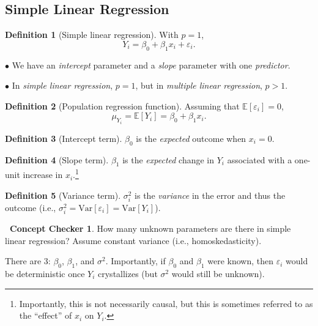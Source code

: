 \documentclass[12pt,oneside]{article}
\newcommand{\E}{\mathbb{E}}
\newcommand{\Var}{\text{Var}}
\theoremstyle{definition}
\newtheorem{definition}{Definition}
\newtheorem{concept}{\faPen \ Concept Checker}
\theoremstyle{remark}
\begin{document}
\subsection{Simple Linear Regression}

\begin{definition}[Simple linear regression]
With $p = 1$, \[Y_i = \beta_0 + \beta_1 x_i + \varepsilon_i.\]

$\bullet$ We have an \textit{intercept} parameter and a \textit{slope} parameter with one \textit{predictor}.

$\bullet$ In \textit{simple linear regression}, $p = 1$, but in \textit{multiple linear regression}, $p > 1$.
\end{definition}

\begin{definition}[Population regression function]
Assuming that $\E[\varepsilon_i] = 0$, \[\mu_{Y_i} = \E[Y_i] = \beta_0 + \beta_1 x_i.\]
\end{definition}

\begin{definition}[Intercept term]
$\beta_0$ is the \textit{expected} outcome when $x_i = 0$.
\end{definition}

\begin{definition}[Slope term]
$\beta_1$ is the \textit{expected} change in $Y_i$ associated with a one-unit increase in $x_i$.\footnote{Importantly, this is not necessarily causal, but this is sometimes referred to as the \enquote{effect} of $x_i$ on $Y_i$.}
\end{definition}

\begin{definition}[Variance term]
$\sigma^2_i$ is the \textit{variance} in the error and thus the outcome (i.e., $\sigma^2_i = \Var[\varepsilon_i] = \Var[Y_i]$).
\end{definition}

\begin{concept}
How many unknown parameters are there in simple linear regression? Assume constant variance (i.e., homoskedasticity).
\end{concept}

\begin{solutionbox}
There are 3: $\beta_0$, $\beta_1$, and $\sigma^2$. Importantly, if $\beta_0$ and $\beta_1$ were known, then $\varepsilon_i$ would be deterministic once $Y_i$ crystallizes (but $\sigma^2$ would still be unknown).
\end{solutionbox}
\end{document}
